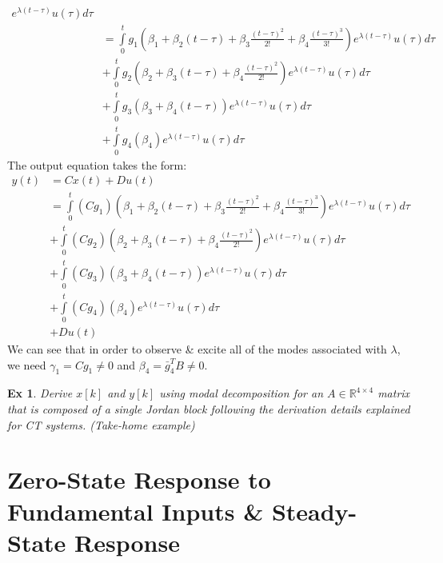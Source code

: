 \documentclass[twoside]{article}
\newtheorem{exmp}[theorem]{Ex}
\begin{document}
\begin{align*}
e^{\lambda (t - \tau)} u(\tau) d \tau 
\\[1ex]
&= \int\limits_{0}^{t} g_1 \left( \beta_1 + \beta_2 (t-\tau) +  \beta_3 \frac{(t-\tau)^2}{2 !} + \beta_4 \frac{(t-\tau)^3}{3 !} \right)  e^{\lambda (t - \tau)} u(\tau) d \tau 
\\[1ex]
&+ \int\limits_{0}^{t} g_2 \left( \beta_2 + \beta_3 (t-\tau) +  \beta_4 \frac{(t-\tau)^2}{2 !}  \right)  e^{\lambda (t - \tau)} u(\tau) d \tau 
\\[1ex]
&+ \int\limits_{0}^{t} g_3 \left( \beta_3 + \beta_4 (t-\tau) \right)  e^{\lambda (t - \tau)} u(\tau) d \tau 
\\[1ex]
&+ \int\limits_{0}^{t} g_4 \left( \beta_4 \right)  e^{\lambda (t - \tau)} u(\tau) d \tau 
\end{align*}
The output equation takes the form:
%
\begin{align*}
    y(t) &= C x(t) + D u(t) 
    \\[1ex]
    &= \int\limits_{0}^{t} (C g_1) \left( \beta_1 + \beta_2 (t-\tau) +  \beta_3 \frac{(t-\tau)^2}{2 !} + \beta_4 \frac{(t-\tau)^3}{3 !} \right)  e^{\lambda (t - \tau)} u(\tau) d \tau 
\\[1ex]
&+ \int\limits_{0}^{t} (C g_2) \left( \beta_2 + \beta_3 (t-\tau) +  \beta_4 \frac{(t-\tau)^2}{2 !}  \right)  e^{\lambda (t - \tau)} u(\tau) d \tau 
\\[1ex]
&+ \int\limits_{0}^{t} (C g_3) \left( \beta_3 + \beta_4 (t-\tau) \right)  e^{\lambda (t - \tau)} u(\tau) d \tau 
\\[1ex]
&+ \int\limits_{0}^{t} (C g_4) \left( \beta_4 \right)  e^{\lambda (t - \tau)} u(\tau) d \tau 
\\[1ex]
&+ D u(t)
\end{align*}
%
We can see that in order to observe \& excite all of the modes associated with $\lambda$, we need $\gamma_1 = C g_1 \neq 0$ and $\beta_4 = \bar{g}_4^T B \neq 0$.

\begin{exmp}
    Derive $x[k]$ and $y[k]$ using modal decomposition for an $A \in \mathbb{R}^{4 \times 4}$ matrix that is composed of a single Jordan block
         following the derivation details explained for CT systems. (Take-home example)
\end{exmp}

\section{Zero-State Response to Fundamental Inputs \& Steady-State Response}
\end{document}
